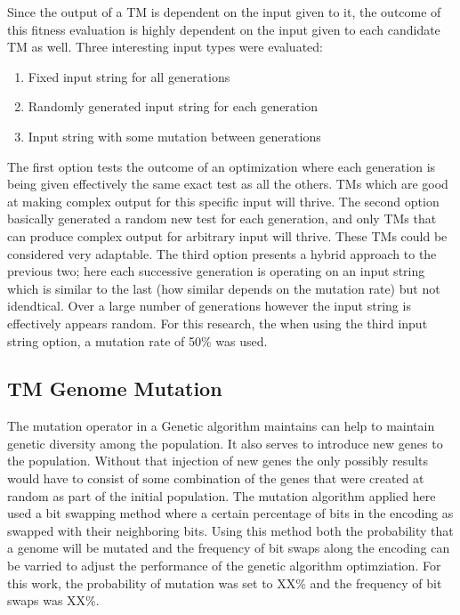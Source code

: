 Since the output of a TM is dependent on the input given to it, the outcome of this fitness evaluation is highly dependent on the input given to each candidate TM as well. Three interesting input types were evaluated: 

\begin{enumerate}
	\item Fixed input string for all generations
	\item Randomly generated input string for each generation
	\item Input string with some mutation between generations
\end{enumerate}

The first option tests the outcome of an optimization where each generation is being given effectively the same exact test as all the others. TMs which are good at making complex output for this specific input will thrive. The second option basically generated a random new test for each generation, and only TMs that can produce complex output for arbitrary input will thrive. These TMs could be considered very adaptable. The third option presents a hybrid approach to the previous two; here each successive generation is operating on an input string which is similar to the last (how similar depends on the mutation rate) but not idendtical. Over a large number of generations however the input string is effectively appears random. For this research, the when using the third input string option, a mutation rate of 50\% was used. 

\subsection{TM Genome Mutation}
The mutation operator in a Genetic algorithm maintains can help to maintain genetic diversity among the population. It also serves to introduce new genes to the population. Without that injection of new genes the only possibly results would have to consist of some combination of the genes that were created at random as part of the initial population. The mutation algorithm applied here used a bit swapping method where a certain percentage of bits in the encoding as swapped with their neighboring bits. Using this method both the probability that a genome will be mutated and the frequency of bit swaps along the encoding can be varried to adjust the performance of the genetic algorithm optimziation. For this work, the probability of mutation was set to XX\% and the frequency of bit swaps was XX\%.
